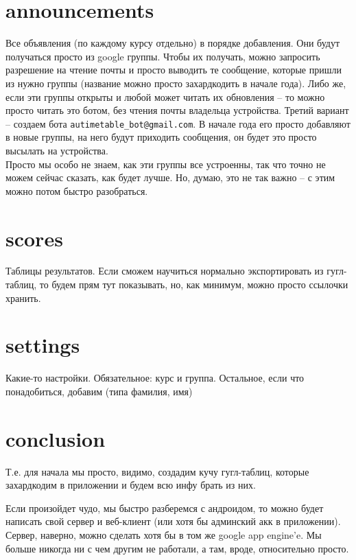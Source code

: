 \documentclass[12pt]{article}
\begin{document}
\section{announcements}
Все объявления (по каждому курсу отдельно) в порядке добавления. Они будут 
получаться просто из
google группы. Чтобы их получать, можно запросить разрешение на чтение
почты и просто выводить те сообщение, которые пришли из нужно группы
(название можно просто захардкодить в начале года). Либо же, если эти
группы открыты и любой может читать их обновления -- то можно просто
читать это ботом, без чтения почты владельца устройства. Третий вариант --
создаем бота \texttt{autimetable\_bot@gmail.com}. В начале года его
просто добавляют в новые группы, на него будут приходить сообщения, он будет
это просто высылать на устройства.\\
Просто мы особо не знаем, как эти группы все устроенны, так что точно не можем
сейчас сказать, как будет лучше. Но, думаю, это не так важно -- с этим можно
потом быстро разобраться.

\section{scores}
Таблицы результатов. Если сможем научиться нормально экспортировать из гугл-
таблиц, то будем прям тут показывать, но, как минимум, можно просто ссылочки 
хранить.

\section{settings}
Какие-то настройки. Обязательное: курс и группа. Остальное, если что 
понадобиться, добавим (типа фамилия, имя)

\section*{conclusion}
Т.е. для начала мы просто, видимо, создадим кучу гугл-таблиц, которые 
захардкодим в приложении и будем всю инфу брать из них. 

Если произойдет чудо,
мы быстро разберемся с андроидом, то можно будет написать свой сервер и 
веб-клиент (или хотя бы админский акк в приложении). Сервер, наверно, можно
сделать хотя бы в том же google app engine'e. Мы больше никогда ни с чем 
другим не работали, а там, вроде, относительно просто.
\end{document}
